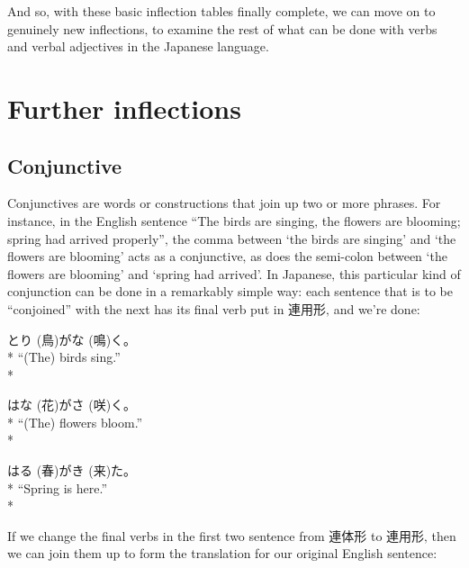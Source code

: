 \documentclass[11pt, b5paper, twoside, openright, onecolumn]{book}
\makeatletter
\newcommand*{\rubystack}[2]{{\relscale{0.5}%
  \begin{tabular}[b]{@{}c@{}}%
    {#1}\\%
   {\textscale{2}{#2}}%
  \end{tabular}}%
}
\DeclareRobustCommand*{\ruby}[2]{%
  \mbox{%
    \setlength{\parskip}{0ex}%
    \BeginAccSupp{method=pdfstringdef,ActualText={#1}}%
      \rubystack{\phantom{#2}}{#1}%
      \llap{%
        \rubystack{#2}{\phantom{#1}}%
      }%
    \EndAccSupp{}%
  }%
}
\renewcommand*{\ruby}[2]{#2 (#1)}%
\newenvironment{exampleblock}{
\setlength{\parindent}{0.6in}
\begin{minipage}[t]{\dimexpr\textwidth-\parindent}}
{\end{minipage}}
\makeatother
\begin{document}
And so‚ with these basic inflection tables finally complete‚ we can move on to genuinely new inflections‚ to examine the rest of what can be done with verbs and verbal adjectives in the Japanese language.

\section{Further inflections}

\subsection{Conjunctive}

Conjunctives are words or constructions that join up two or more phrases. For instance‚ in the English sentence “The birds are singing‚ the flowers are blooming; spring had arrived properly”‚ the comma between ‘the birds are singing’ and ‘the flowers are blooming’ acts as a conjunctive‚ as does the semi-colon between ‘the flowers are blooming’ and ‘spring had arrived’. In Japanese‚ this particular kind of conjunction can be done in a remarkably simple way: each sentence that is to be “conjoined” with the next has its final verb put in 連用形‚ and we’re done:

\vspace{0.4cm}
\begin{exampleblock}
\ruby{鳥}{とり}が\ruby{鳴}{な}く。 \\* 
“(The) birds sing.” \\* 
\end{exampleblock}
\vspace{0.2cm}

\begin{exampleblock}
\ruby{花}{はな}が\ruby{咲}{さ}く。 \\* 
“(The) flowers bloom.” \\* 
\end{exampleblock}
\vspace{0.2cm}

\begin{exampleblock}
\ruby{春}{はる}が\ruby{来}{き}た。 \\* 
“Spring is here.” \\* 
\end{exampleblock}
\vspace{0.2cm}

If we change the final verbs in the first two sentence from 連体形 to 連用形‚ then we can join them up to form the translation for our original English sentence:
\end{document}
